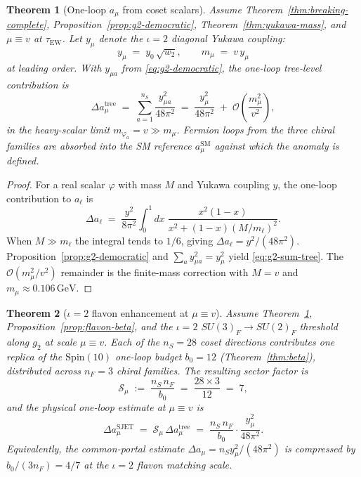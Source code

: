 \documentclass[aps,prd,onecolumn,amsmath,amssymb,nofootinbib,11pt]{revtex4-2}
\numberwithin{equation}{section}
\theoremstyle{plain}
\newtheorem{theorem}{Theorem}[section]
\theoremstyle{definition}
\theoremstyle{remark}
\newcommand{\Spin}{\mathrm{Spin}}
\begin{document}
\begin{theorem}[One-loop $a_\mu$ from coset scalars]\label{thm:g2-oneloop}
Assume Theorem~\ref{thm:breaking-complete}, Proposition~\ref{prop:g2-democratic},
Theorem~\ref{thm:yukawa-mass}, and $\mu\equiv v$ at $\tau_{\mathrm{EW}}$.
Let $y_\mu$ denote the $\iota=2$ diagonal Yukawa coupling:
\begin{equation}\label{eq:ymu-def}
  y_\mu \;=\; y_0\,\sqrt{w_2},
  \qquad
  m_\mu \;=\; v\,y_\mu
\end{equation}
at leading order. With $y_{\mu a}$ from \eqref{eq:g2-democratic}, the
one-loop tree-level contribution is
\begin{equation}\label{eq:g2-sum-tree}
  \Delta a_\mu^{\mathrm{tree}}
  \;=\;
  \sum_{a=1}^{n_S}
  \frac{y_{\mu a}^2}{48\pi^2}
  \;=\;
  \frac{y_\mu^2}{48\pi^2}
  \;+\;
  \mathcal{O}\!\left(\frac{m_\mu^2}{v^2}\right),
\end{equation}
in the heavy-scalar limit $m_{\varphi_a}=v\gg m_\mu$. Fermion loops from the
three chiral families are absorbed into the SM reference
$a_\mu^{\mathrm{SM}}$ against which the anomaly is defined.
\end{theorem}

\begin{proof}
For a real scalar $\varphi$ with mass $M$ and Yukawa coupling $y$, the
one-loop contribution to $a_\ell$ is~\cite{Leveille1978}
\begin{equation}\label{eq:g2-integral}
  \Delta a_\ell
  \;=\;
  \frac{y^2}{8\pi^2}
  \int_0^1\!dx\;
  \frac{x^2(1-x)}{x^2+(1-x)(M/m_\ell)^2}.
\end{equation}
When $M\gg m_\ell$ the integral tends to $1/6$, giving
$\Delta a_\ell=y^2/(48\pi^2)$. Proposition~\ref{prop:g2-democratic} and
$\sum_a y_{\mu a}^2=y_\mu^2$ yield \eqref{eq:g2-sum-tree}. The
$\mathcal{O}(m_\mu^2/v^2)$ remainder is the finite-mass correction with
$M=v$ and $m_\mu\approx0.106\,\mathrm{GeV}$.
\end{proof}

\begin{theorem}[$\iota=2$ flavon enhancement at $\mu\equiv v$]\label{thm:g2-flavon}
Assume Theorem~\ref{thm:g2-oneloop}, Proposition~\ref{prop:flavon-beta}, and
the $\iota=2$ $SU(3)_F\to SU(2)_F$ threshold along $g_2$ at scale $\mu\equiv v$.
Each of the $n_S=28$ coset directions contributes one replica of the
$\Spin(10)$ one-loop budget $b_0=12$ (Theorem~\ref{thm:beta}), distributed
across $n_F=3$ chiral families. The resulting sector factor is
\begin{equation}\label{eq:g2-sector-factor}
  \mathcal{S}_{\mu}
  \;:=\;
  \frac{n_S\,n_F}{b_0}
  \;=\;
  \frac{28\times 3}{12}
  \;=\;
  7,
\end{equation}
and the physical one-loop estimate at $\mu\equiv v$ is
\begin{equation}\label{eq:g2-sum}
  \Delta a_\mu^{\mathrm{SJET}}
  \;=\;
  \mathcal{S}_{\mu}\,
  \Delta a_\mu^{\mathrm{tree}}
  \;=\;
  \frac{n_S\,n_F}{b_0}\cdot\frac{y_\mu^2}{48\pi^2}.
\end{equation}
Equivalently, the common-portal estimate
$\Delta a_\mu=n_S y_\mu^2/(48\pi^2)$ is compressed by
$b_0/(3n_F)=4/7$ at the $\iota=2$ flavon matching scale.
\end{theorem}
\end{document}
